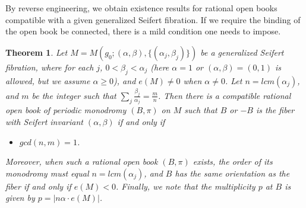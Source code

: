 \documentclass[11pt]{amsart}
\theoremstyle{plain}
\newtheorem{theorem}{Theorem}
\numberwithin{theorem}{section}
\theoremstyle{definition}
\begin{document}
By reverse engineering, we obtain existence results for rational open books compatible with a
given generalized Seifert fibration. If we require the binding of the open book be connected, there is a
mild condition one needs to impose. 

\begin{theorem}
Let $M=M(g_0; (\alpha,\beta), \{(\alpha_j,\beta_j)\})$ be a generalized Seifert fibration, where for each $j$, $0<\beta_j<\alpha_j$ {\em(}here $\alpha=1$ or $(\alpha,\beta)=(0,1)$ is allowed, but we assume 
$\alpha\geq 0${\em)}, and $e(M)\neq 0$ when $\alpha\neq 0$. Let 
$n=lcm(\alpha_j)$, and $m$ be the integer such that $\sum_j \frac{\beta_j}{\alpha_j}=\frac{m}{n}$.
Then there is a compatible rational open book of periodic monodromy $(B,\pi)$ on $M$ such that 
$B$ or $-B$ is the fiber with Seifert invariant $(\alpha,\beta)$ if and only if 
\begin{itemize}
\item [{(*)}] $gcd(n,m)=1$.
\end{itemize}
Moreover, when such a rational open book $(B,\pi)$ exists, the order of its monodromy must equal 
$n=lcm(\alpha_j)$, and $B$ has the same orientation as the fiber if and only if $e(M)<0$. Finally, we note that the multiplicity $p$ at $B$ is given by $p=|n\alpha \cdot e(M)|$.
\end{theorem}
\end{document}
